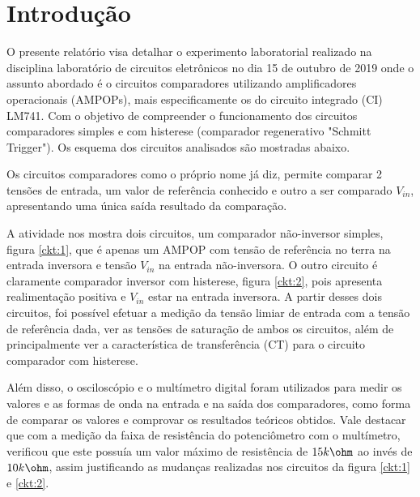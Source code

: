 \section{Introdução}

O presente relatório visa detalhar o experimento laboratorial realizado na disciplina laboratório de circuitos eletrônicos no dia 15 de outubro de 2019 onde o assunto abordado é o circuitos comparadores utilizando amplificadores operacionais (AMPOPs), mais especificamente os do circuito integrado (CI) LM741. Com o objetivo de compreender o funcionamento dos circuitos comparadores simples e com histerese (comparador regenerativo "Schmitt Trigger"). Os esquema dos circuitos analisados são mostradas abaixo.




Os circuitos comparadores como o próprio nome já diz, permite comparar 2 tensões de entrada, um valor de referência conhecido e outro a ser comparado $V_{in}$, apresentando uma única saída resultado da comparação.

A atividade nos mostra dois circuitos, um comparador não-inversor simples, figura \ref{ckt:1}, que é apenas um AMPOP com tensão de referência no terra na entrada inversora e tensão $V_{in}$ na entrada não-inversora. O outro circuito é claramente comparador inversor com histerese, figura \ref{ckt:2}, pois apresenta realimentação positiva e $V_{in}$ estar na entrada inversora. A partir desses dois circuitos, foi possível efetuar a medição da tensão limiar de entrada com a tensão de referência dada, ver as tensões de saturação de ambos os circuitos, além de principalmente ver a característica de transferência (CT) para o circuito comparador com histerese. 

Além disso, o osciloscópio e o multímetro digital foram utilizados para medir os valores e as formas de onda na entrada e na saída dos comparadores, como forma de comparar os valores e comprovar os resultados teóricos obtidos. Vale destacar que com a medição da faixa de resistência do potenciômetro com o multímetro, verificou que este possuía um valor máximo de resistência de $15k \ohm$ ao invés de $10k \ohm$, assim justificando as mudanças realizadas nos circuitos da figura \ref{ckt:1} e \ref{ckt:2}.